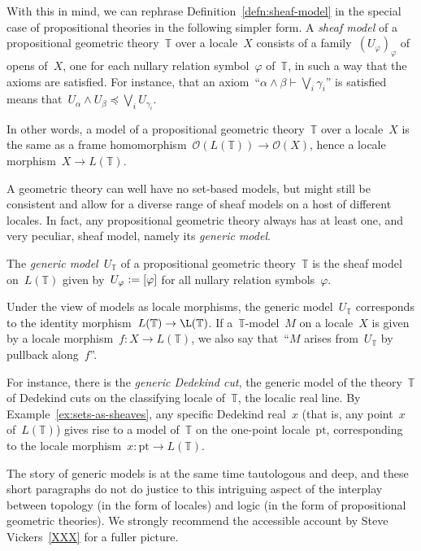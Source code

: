 \documentclass{ws-rv9x6}
\renewcommand{\O}{\mathcal{O}}
\newcommand{\TT}{\mathbb{T}}
\newcommand{\defeq}{\vcentcolon=}
\renewcommand{\_}{\mathpunct{.}}
\newcommand{\?}{\,{:}\,}
\newcommand{\pt}{\mathrm{pt}}
\begin{document}
With this in mind, we can rephrase Definition~\ref{defn:sheaf-model} in the
special case of propositional theories in the following simpler form. A
\emph{sheaf model} of a propositional geometric theory~$\TT$ over a locale~$X$
consists of a family~$(U_\varphi)_\varphi$ of opens of~$X$, one for each
nullary relation symbol~$\varphi$ of~$\TT$, in such a way that the axioms are
satisfied. For instance, that an axiom~``$\alpha \wedge \beta \vdash \bigvee_i
\gamma_i$'' is satisfied means that~$U_\alpha \wedge U_\beta \preceq \bigvee_i
U_{\gamma_i}$.

In other words, a model of a propositional geometric theory~$\TT$ over a
locale~$X$ is the same as a frame homomorphism~$\O(L(\TT)) \to \O(X)$, hence a
locale morphism~$X \to L(\TT)$.

A geometric theory can well have no set-based models, but might still be
consistent and allow for a diverse range of sheaf models on a host of different
locales. In fact, any propositional geometric theory always has at least one,
and very peculiar, sheaf model, namely its \emph{generic model}.

\begin{definition}The \emph{generic model}~$U_\TT$ of a propositional geometric
theory~$\TT$ is the sheaf model on~$L(\TT)$ given by~$U_\varphi \defeq
[\varphi]$ for all nullary relation symbols~$\varphi$.\end{definition}

Under the view of models as locale morphisms, the generic model~$U_\TT$
corresponds to the identity morphism~$L(\TT) \to \L(\TT)$. If a~$\TT$-model~$M$ on
a locale~$X$ is given by a locale morphism~$f : X \to L(\TT)$, we also say
that~``$M$ arises from~$U_\TT$ by pullback along~$f$''.

For instance, there is the \emph{generic Dedekind cut}, the generic model of
the theory~$\TT$ of Dedekind cuts on the classifying locale of~$\TT$, the
localic real line. By Example~\ref{ex:sets-as-sheaves}, any specific Dedekind
real~$x$ (that is, any point~$x$ of~$L(\TT)$) gives rise to a model of~$\TT$ on
the one-point locale~$\pt$, corresponding to the locale morphism~$x : \pt \to
L(\TT)$.

The story of generic models is at the same time tautologous and deep, and these
short paragraphs do not do justice to this intriguing aspect of the interplay
between topology (in the form of locales) and logic (in the form of
propositional geometric theories). We strongly
recommend the accessible account by Steve Vickers~\ref{XXX} for a fuller
picture.
\end{document}

